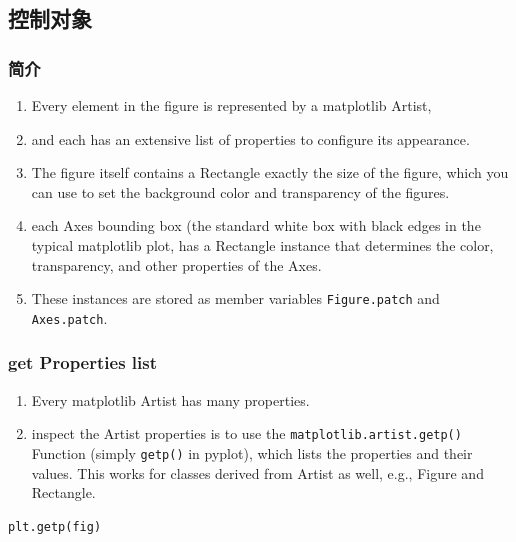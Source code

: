 \documentclass[UTF8,a4paper,12pt]{ctexart}  %
\providecommand{\tightlist}{\setlength{\itemsep}{0pt}\setlength{\parskip}{0pt}}
\newcommand{\passthrough}[1]{\lstset{mathescape=false}#1\lstset{mathescape=true}}
\begin{document}
\hypertarget{ux63a7ux5236ux5bf9ux8c61}{%
\subsection{控制对象}\label{ux63a7ux5236ux5bf9ux8c61}}

\hypertarget{ux7b80ux4ecb-1}{%
\subsubsection{简介}\label{ux7b80ux4ecb-1}}

\begin{enumerate}
\def\labelenumi{\arabic{enumi}.}
\tightlist
\item
  Every element in the figure is represented by a matplotlib Artist,
\item
  and each has an extensive list of properties to configure its
  appearance.
\item
  The figure itself contains a Rectangle exactly the size of the
  figure, which you can use to set the background color and
  transparency of the figures.
\item
  each Axes bounding box (the standard white box with black edges in
  the typical matplotlib plot, has a Rectangle instance that
  determines the color, transparency, and other properties of the
  Axes.
\item
  These instances are stored as member variables \passthrough{\lstinline!Figure.patch!} and
  \passthrough{\lstinline!Axes.patch!}.
\end{enumerate}

\hypertarget{get-properties-list}{%
\subsubsection{get Properties list}\label{get-properties-list}}

\begin{enumerate}
\def\labelenumi{\arabic{enumi}.}
\tightlist
\item
  Every matplotlib Artist has many properties.
\item
  inspect the Artist properties is to use the
  \passthrough{\lstinline!matplotlib.artist.getp()!} Function (simply \passthrough{\lstinline!getp()!} in pyplot),
  which lists the properties and their values. This works for classes
  derived from Artist as well, e.g., Figure and Rectangle.
\end{enumerate}

\begin{lstlisting}[language=Python]
plt.getp(fig)
\end{lstlisting}
\end{document}

